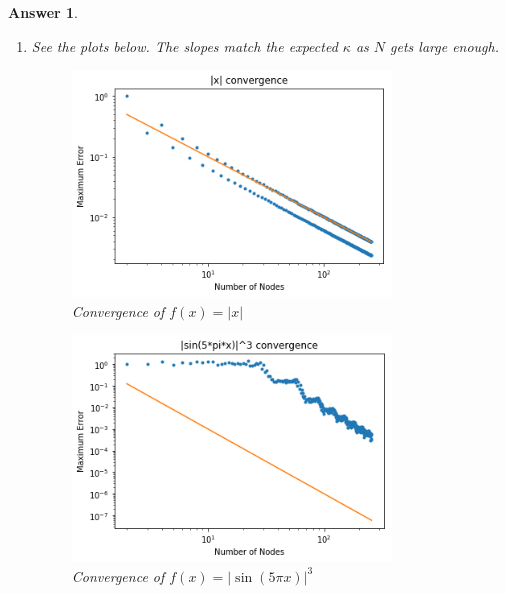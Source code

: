 \documentclass[12pt]{article}
\theoremstyle{colon}
\newtheorem*{answer}{Answer}
\begin{document}
\begin{answer}
\begin{enumerate}[label=\alph*)]
      \begin{enumerate}[label=\roman*)]
        \item See the plots below. The slopes match the expected $\kappa$ as $N$ gets large enough.
          \begin{figure}[H]
            \centering
              \includegraphics[width=0.8\textwidth]{q2dia.png}
            \caption{Convergence of $f(x) = \lvert x \rvert$}
          \end{figure}

          \begin{figure}[H]
            \centering
              \includegraphics[width=0.8\textwidth]{q2dib.png}
            \caption{Convergence of $f(x) = \lvert \sin(5 \pi x) \rvert^3$}
          \end{figure}


\end{enumerate}
\end{enumerate}
\end{answer}
\end{document}

